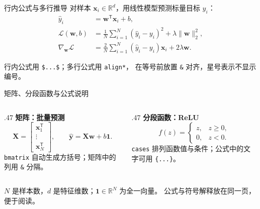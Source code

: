 \begin{frame}{行内公式与多行推导}
  对样本 $\mathbf{x}_i\in\mathbb{R}^{d}$，用线性模型预测标量目标 $y_i$：
  \begin{align*}
    \widehat{y}_i &= \mathbf{w}^{\mathsf T}\mathbf{x}_i+b, \\
    \mathcal{L}(\mathbf{w},b)
      &= \frac{1}{N}\sum_{i=1}^{N}(\widehat{y}_i-y_i)^2
         +\lambda\lVert\mathbf{w}\rVert_2^2, \\
    \nabla_{\mathbf{w}}\mathcal{L}
      &= \frac{2}{N}\sum_{i=1}^{N}(\widehat{y}_i-y_i)\mathbf{x}_i
         +2\lambda\mathbf{w}.
  \end{align*}
  \begin{notebox}[排版要点]
    行内公式用 \texttt{\$...\$}；多行公式用 \texttt{align*}，
    在等号前放置 \texttt{\&} 对齐，星号表示不显示编号。
  \end{notebox}
\end{frame}

\begin{frame}{矩阵、分段函数与公式说明}
  \begin{columns}[T,onlytextwidth]
    \begin{column}{.47\textwidth}
      \textbf{矩阵：批量预测}
      \[
        \mathbf{X}=\begin{bmatrix}
          \mathbf{x}_1^{\mathsf T}\\
          \vdots\\
          \mathbf{x}_N^{\mathsf T}
        \end{bmatrix},\qquad
        \widehat{\mathbf{y}}=\mathbf{X}\mathbf{w}+b\mathbf{1}.
      \]
      \texttt{bmatrix} 自动生成方括号；矩阵中的列用 \texttt{\&} 分隔。
    \end{column}
    \begin{column}{.47\textwidth}
      \textbf{分段函数：ReLU}
      \[
        f(z)=\begin{cases}
          z, & z\geq 0,\\
          0, & z<0.
        \end{cases}
      \]
      \texttt{cases} 排列函数值与条件；公式中的文字可用 \texttt{\string\text\{...\}}。
    \end{column}
  \end{columns}
  \medskip
  \begin{tipbox}[符号与说明]
    $N$ 是样本数，$d$ 是特征维数；$\mathbf{1}\in\mathbb{R}^{N}$ 为全一向量。
    公式与符号解释放在同一页，便于阅读。
  \end{tipbox}
\end{frame}
